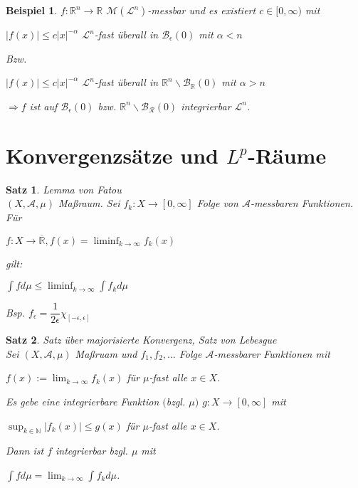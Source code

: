 \documentclass[11pt]{memoir}
\theoremstyle{changebreak}
\newtheorem{Beispiel}{Beispiel}[chapter]
\newtheorem{Satz}{Satz}[chapter]
\begin{document}
\begin{Beispiel}
$f: \mathbb R^n \rightarrow \mathbb R$ $\mathscr M(\mathscr L^n)$-messbar und es existiert $c \in [0, \infty)$ mit 
\begin{center}
	$|f(x)| \leq c|x|^{-\alpha}$ $\mathscr L^n$-fast überall in $\mathscr B_\epsilon (0)$ mit $\alpha < n$ 
\end{center}
Bzw. 
\begin{center}
	$|f(x)| \leq c|x|^{-\alpha}$ $\mathscr L^n$-fast überall in $\mathbb R^n \backslash \mathscr B_\mathbb R (0)$ mit $\alpha > n$ 
\end{center}
\begin{center}
	$\Rightarrow f$ ist auf $\mathscr B_\epsilon (0)$ bzw. $\mathbb R^n \backslash \mathscr B_\mathscr R (0)$ integrierbar $\mathscr L^n$.
\end{center} 
\end{Beispiel}


\section{Konvergenzsätze und $L^p$-Räume}

\begin{Satz}
\emph{Lemma von Fatou} \\
$(X, \mathscr A, \mu)$ Maßraum. Sei $f_k: X \rightarrow [0, \infty]$ Folge von $\mathscr A$-messbaren Funktionen. Für 
\begin{center}
	$f: X \rightarrow \overline{\mathbb R}, f(x) = \liminf_{k \rightarrow \infty} f_k (x)$
\end{center}
gilt: \\
\begin{center}
$\int f d\mu \leq \liminf_{k \rightarrow \infty} \int f_k d\mu$
\end{center}

Bsp. $f_\epsilon = \dfrac{1}{2\epsilon} \chi_{[-\epsilon, \epsilon]}$
\end{Satz}

\begin{Satz}
\emph{Satz über majorisierte Konvergenz, Satz von Lebesgue} \\
Sei $(X, \mathscr A, \mu)$ Maßruam und $f_1, f_2, ...$ Folge $\mathscr A$-messbarer Funktionen mit 
\begin{center}
	$f(x) := \lim_{k \rightarrow \infty} f_k (x)$ für $\mu$-fast alle $x \in X$. 
\end{center}
Es gebe eine integrierbare Funktion $($bzgl. $\mu)$ $g: X \rightarrow [0, \infty]$ mit 
\begin{center}
	$\sup_{k \in \mathbb N} |f_k (x)| \leq g(x)$ für $\mu$-fast alle $x \in X$. 
\end{center}
Dann ist $f$ integrierbar bzgl. $\mu$ mit
\begin{center}
$\int f d\mu = \lim_{k \rightarrow \infty} \int f_k d\mu$.
\end{center}
\end{Satz}
\end{document}
